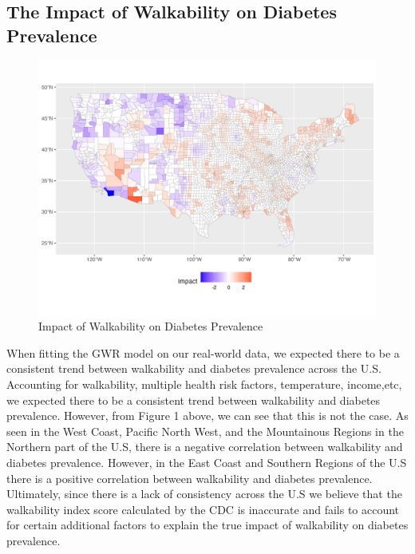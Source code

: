 \documentclass[
]{article}
\begin{document}
\subsection{The Impact of Walkability on Diabetes
Prevalence}\label{the-impact-of-walkability-on-diabetes-prevalence}

\begin{figure}[H]

{\centering \includegraphics{impact_plot.png}

}

\caption{Impact of Walkability on Diabetes Prevalence}

\end{figure}%

When fitting the GWR model on our real-world data, we expected there to
be a consistent trend between walkability and diabetes prevalence across
the U.S. Accounting for walkability, multiple health risk factors,
temperature, income,etc, we expected there to be a consistent trend
between walkability and diabetes prevalence. However, from Figure 1
above, we can see that this is not the case. As seen in the West Coast,
Pacific North West, and the Mountainous Regions in the Northern part of
the U.S, there is a negative correlation between walkability and
diabetes prevalence. However, in the East Coast and Southern Regions of
the U.S there is a positive correlation between walkability and diabetes
prevalence. Ultimately, since there is a lack of consistency across the
U.S we believe that the walkability index score calculated by the CDC is
inaccurate and fails to account for certain additional factors to
explain the true impact of walkability on diabetes prevalence.
\end{document}

